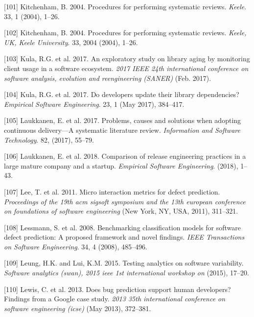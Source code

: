 \documentclass[]{book}
\begin{document}
\hypertarget{ref-Kitchenham2004}{}
{[}101{]} Kitchenham, B. 2004. Procedures for performing systematic
reviews. \emph{Keele}. 33, 1 (2004), 1--26.

\hypertarget{ref-kitchenham2004procedures}{}
{[}102{]} Kitchenham, B. 2004. Procedures for performing systematic
reviews. \emph{Keele, UK, Keele University}. 33, 2004 (2004), 1--26.

\hypertarget{ref-Kula2017-2}{}
{[}103{]} Kula, R.G. et al. 2017. An exploratory study on library aging
by monitoring client usage in a software ecosystem. \emph{2017 IEEE 24th
international conference on software analysis, evolution and
reengineering (SANER)} (Feb. 2017).

\hypertarget{ref-Kula2017}{}
{[}104{]} Kula, R.G. et al. 2017. Do developers update their library
dependencies? \emph{Empirical Software Engineering}. 23, 1 (May 2017),
384--417.

\hypertarget{ref-laukkanen2017a}{}
{[}105{]} Laukkanen, E. et al. 2017. Problems, causes and solutions when
adopting continuous delivery---A systematic literature review.
\emph{Information and Software Technology}. 82, (2017), 55--79.

\hypertarget{ref-laukkanen2018a}{}
{[}106{]} Laukkanen, E. et al. 2018. Comparison of release engineering
practices in a large mature company and a startup. \emph{Empirical
Software Engineering}. (2018), 1--43.

\hypertarget{ref-Lee2011}{}
{[}107{]} Lee, T. et al. 2011. Micro interaction metrics for defect
prediction. \emph{Proceedings of the 19th acm sigsoft symposium and the
13th european conference on foundations of software engineering} (New
York, NY, USA, 2011), 311--321.

\hypertarget{ref-Lessman2008}{}
{[}108{]} Lessmann, S. et al. 2008. Benchmarking classification models
for software defect prediction: A proposed framework and novel findings.
\emph{IEEE Transactions on Software Engineering}. 34, 4 (2008),
485--496.

\hypertarget{ref-leung2015testing}{}
{[}109{]} Leung, H.K. and Lui, K.M. 2015. Testing analytics on software
variability. \emph{Software analytics (swan), 2015 ieee 1st
international workshop on} (2015), 17--20.

\hypertarget{ref-Lewis2013}{}
{[}110{]} Lewis, C. et al. 2013. Does bug prediction support human
developers? Findings from a Google case study. \emph{2013 35th
international conference on software engineering (icse)} (May 2013),
372--381.
\end{document}
